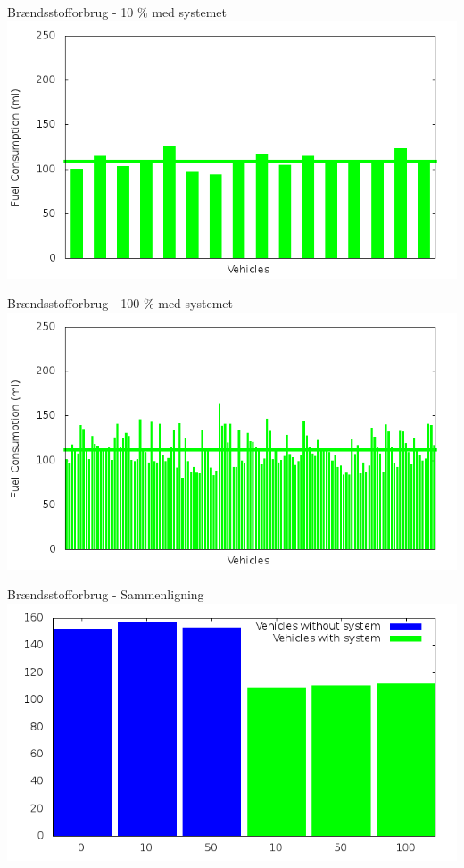\begin{frame}{Brændsstofforbrug - 10 \% med systemet}
\includegraphics[width=1\textwidth]{../Article/images/tp0/fuelRouteControlled10.png}
\end{frame}

\begin{frame}{Brændsstofforbrug - 100 \% med systemet}
\includegraphics[width=1\textwidth]{../Article/images/tp0/fuelRouteControlled100.png}
\end{frame}

\begin{frame}{Brændsstofforbrug - Sammenligning}
\includegraphics[width=1\textwidth]{../Article/images/tp0/combinedFuel.png}
\end{frame}




